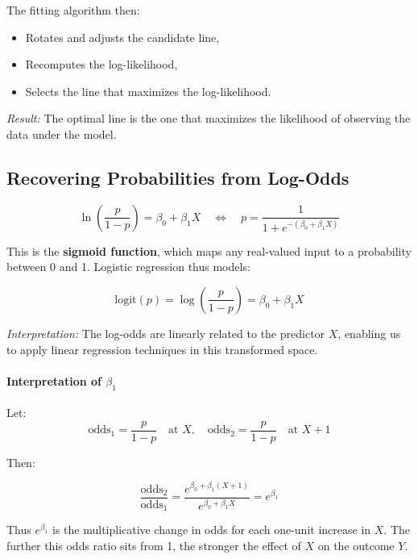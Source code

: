 The fitting algorithm then:

\begin{itemize}
    \item Rotates and adjusts the candidate line,
    \item Recomputes the log-likelihood,
    \item Selects the line that maximizes the log-likelihood.
\end{itemize}

\textit{Result:} The optimal line is the one that maximizes the likelihood of observing the data under the model.

\subsection{Recovering Probabilities from Log-Odds}

\[
\ln\left(\frac{p}{1-p}\right) = \beta_0 + \beta_1 X
\quad \Leftrightarrow \quad
p = \frac{1}{1 + e^{-(\beta_0 + \beta_1 X)}}
\]

This is the \textbf{sigmoid function}, which maps any real-valued input to a probability between 0 and 1. Logistic regression thus models:

\begin{equation}
\text{logit}(p) = \log\left(\frac{p}{1-p}\right) = \beta_0 + \beta_1 X
\end{equation}

\textit{Interpretation:} The log-odds are linearly related to the predictor \(X\), enabling us to apply linear regression techniques in this transformed space.

\paragraph{Interpretation of \(\beta_1\)}

Let:
\[
\text{odds}_1 = \frac{p}{1-p} \quad \text{at } X, \quad
\text{odds}_2 = \frac{p}{1-p} \quad \text{at } X+1
\]

Then:

\begin{equation}
\frac{\text{odds}_2}{\text{odds}_1} = \frac{e^{\beta_0 + \beta_1(X+1)}}{e^{\beta_0 + \beta_1 X}} = e^{\beta_1}
\end{equation}

Thus \(e^{\beta_1}\) is the multiplicative change in odds for each one-unit increase in \(X\). The further this odds ratio sits from 1, the stronger the effect of \(X\) on the outcome \(Y\).